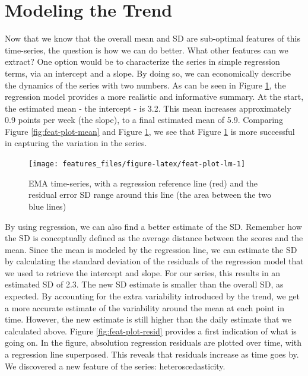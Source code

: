 \documentclass[]{book}
\begin{document}
\section{Modeling the Trend}\label{modeling-the-trend}

Now that we know that the overall mean and SD are sub-optimal features
of this time-series, the question is how we can do better. What other
features can we extract? One option would be to characterize the series
in simple regression terms, via an intercept and a slope. By doing so,
we can economically describe the dynamics of the series with two
numbers. As can be seen in Figure \ref{fig:feat-plot-lm}, the regression
model provides a more realistic and informative summary. At the start,
the estimated mean - the intercept - is 3.2. This mean increases
approximately 0.9 points per week (the slope), to a final estimated mean
of 5.9. Comparing Figure \ref{fig:feat-plot-mean} and Figure
\ref{fig:feat-plot-lm}, we see that Figure \ref{fig:feat-plot-lm} is
more successful in capturing the variation in the series.

\begin{figure}

{\centering \texttt{[image: features\_files/figure-latex/feat-plot-lm-1]} 

}

\caption{EMA time-series, with a regression reference line (red) and the residual error SD range around this line (the area between the two blue lines)}\label{fig:feat-plot-lm}
\end{figure}

By using regression, we can also find a better estimate of the SD.
Remember how the SD is conceptually defined as the average distance
between the scores and the mean. Since the mean is modeled by the
regression line, we can estimate the SD by calculating the standard
deviation of the residuals of the regression model that we used to
retrieve the intercept and slope. For our series, this results in an
estimated SD of 2.3. The new SD estimate is smaller than the overall SD,
as expected. By accounting for the extra variability introduced by the
trend, we get a more accurate estimate of the variability around the
mean at each point in time. However, the new estimate is still higher
than the daily estimate that we calculated above. Figure
\ref{fig:feat-plot-resid} provides a first indication of what is going
on. In the figure, absolution regression residuals are plotted over
time, with a regression line superposed. This reveals that residuals
increase as time goes by. We discovered a new feature of the series:
heteroscedasticity.
\end{document}
